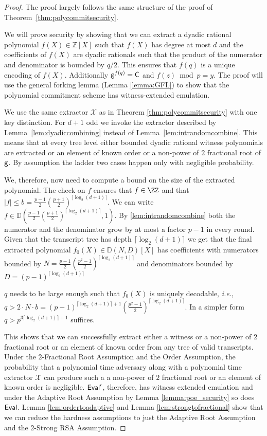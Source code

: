 \begin{proof}
The proof largely follows the same structure of the proof of Theorem~\ref{thm:polycommitsecurity}.
	
We will prove security by showing that we can extract a dyadic rational polynomial $f(X)\in \mathbb{Z}[X]$ such that $f(X)$ has degree at most $d$ and the coefficients of $f(X)$ are dyadic rationals such that the product of the numerator and denominator is bounded by $q/2$. This ensures that $f(q)$ is a unique encoding of $f(X)$. Additionally $\mathsf{g}^{f(q)}=\mathsf{C}$ and $f(z) \bmod p=y$. The proof will use the general forking lemma (Lemma \ref{lemma:GFL}) to show that the polynomial commitment scheme has witness-extended emulation. 

We use the same extractor $\mathcal{X}$ as in Theorem \ref{thm:polycommitsecurity} with one key distinction. 
For $d+1$ odd we invoke the extractor described by Lemma~\ref{lem:dyadiccombining} instead of Lemma~\ref{lem:intrandomcombine}. 
This means that at every tree level either bounded dyadic rational witness polynomials are extracted or an element of known order or a non-power of $2$ fractional root of $\mathsf{g}$. By assumption the ladder two cases happen only with negligible probability.

We, therefore, now need to compute a bound on the size of the extracted polynomial. 
The check on $f$ ensures that $f\in \ZZ$ and that $|f|\leq b=\frac{p-1}{2} (\frac{p+1}{2})^{\lceil \log_2(d+1)\rceil}$. We can write $f\in\mathbb{D}(\frac{p-1}{2} (\frac{p+1}{2})^{\lceil \log_2(d+1)\rceil},1)$. By \ref{lem:intrandomcombine} both the numerator and the denominator grow by at most a factor $p-1$ in every round.
Given that the transcript tree has depth $\lceil \log_2(d+1)\rceil$ we get that the final extracted polynomial $f_0(X)\in \mathbb{D}(N,D)[X]$ has coefficients with numerators bounded by $N= \frac{p-1}{2}(\frac{p^2-1}{2})^{\lceil \log_2(d+1)\rceil}$ and denominators bounded by $D=(p-1)^{\lceil \log_2(d+1)\rceil}$

$q$ needs to be large enough such that $f_0(X)$ is uniquely decodable, \emph{i.e.}, $q>2\cdot N\cdot b=(p-1)^{\lceil \log_2(d+1)\rceil+1}(\frac{p^2-1}{2})^{\lceil \log_2(d+1)\rceil}$. In a simpler form $q>p^{3\lceil\log_2(d+1)\rceil+1}$ suffices.

This shows that we can successfully extract either a witness or a non-power of $2$ fractional root or an element of known order from any tree of valid transcripts.
Under the $2$-Fractional Root Assumption and the Order Assumption, the probability that a polynomial time adversary along with a polynomial time extractor $\mathcal{X}$ can produce such a a  non-power of $2$ fractional root or an element of known order is negligible. $\textsf{{Eval}}'$, therefore, has witness extended emulation and under the Adaptive Root Assumption by Lemma \ref{lemma:poe_security} so does $\textsf{{Eval}}$.
Lemma \ref{lem:ordertoadaptive} and Lemma \ref{lem:strongtofractional} show that we can reduce the hardness assumptions to just the Adaptive Root Assumption and the  $2$-Strong RSA Assumption. 
\end{proof}

